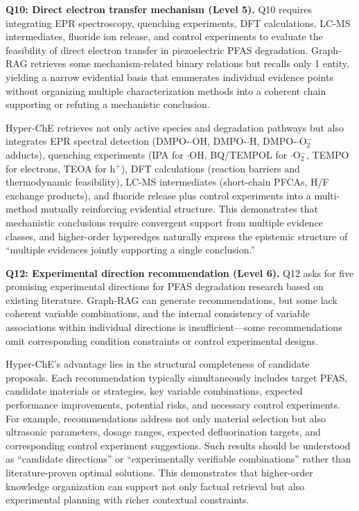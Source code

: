 \documentclass[11pt,a4paper]{article}
\begin{document}
\textbf{Q10: Direct electron transfer mechanism (Level 5).} Q10 requires integrating EPR spectroscopy, quenching experiments, DFT calculations, LC-MS intermediates, fluoride ion release, and control experiments to evaluate the feasibility of direct electron transfer in piezoelectric PFAS degradation. Graph-RAG retrieves some mechanism-related binary relations but recalls only 1 entity, yielding a narrow evidential basis that enumerates individual evidence points without organizing multiple characterization methods into a coherent chain supporting or refuting a mechanistic conclusion.

Hyper-ChE retrieves not only active species and degradation pathways but also integrates EPR spectral detection (DMPO-$\cdot$OH, DMPO-$\cdot$H, DMPO-$\cdot$O$_2^-$ adducts), quenching experiments (IPA for $\cdot$OH, BQ/TEMPOL for $\cdot$O$_2^-$, TEMPO for electrons, TEOA for h$^+$), DFT calculations (reaction barriers and thermodynamic feasibility), LC-MS intermediates (short-chain PFCAs, H/F exchange products), and fluoride release plus control experiments into a multi-method mutually reinforcing evidential structure. This demonstrates that mechanistic conclusions require convergent support from multiple evidence classes, and higher-order hyperedges naturally express the epistemic structure of ``multiple evidences jointly supporting a single conclusion.''

\textbf{Q12: Experimental direction recommendation (Level 6).} Q12 asks for five promising experimental directions for PFAS degradation research based on existing literature. Graph-RAG can generate recommendations, but some lack coherent variable combinations, and the internal consistency of variable associations within individual directions is insufficient---some recommendations omit corresponding condition constraints or control experimental designs.

Hyper-ChE's advantage lies in the structural completeness of candidate proposals. Each recommendation typically simultaneously includes target PFAS, candidate materials or strategies, key variable combinations, expected performance improvements, potential risks, and necessary control experiments. For example, recommendations address not only material selection but also ultrasonic parameters, dosage ranges, expected defluorination targets, and corresponding control experiment suggestions. Such results should be understood as ``candidate directions'' or ``experimentally verifiable combinations'' rather than literature-proven optimal solutions. This demonstrates that higher-order knowledge organization can support not only factual retrieval but also experimental planning with richer contextual constraints.
\end{document}
